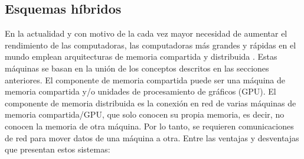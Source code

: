 \vspace{0.35cm}
\begin{table}[htbp]
\centering
\caption{Ventajas y desventajas de las arquitecturas basadas en memoria distribuida.}
\label{tab:distributed_memory}
\end{table}
\vspace{0.35cm}

\subsection{Esquemas híbridos}
\label{sec:esquemas_hibridos}

En la actualidad y con motivo de la cada vez mayor necesidad de aumentar el rendimiento de las computadoras, las computadoras más grandes y rápidas en el mundo emplean arquitecturas de memoria compartida y distribuida \cite{rekimoto1999augmented}. Estas máquinas se basan en la unión de los conceptos descritos en las secciones anteriores. El componente de memoria compartida puede ser una máquina de memoria compartida y/o unidades de procesamiento de gráficos (GPU). El componente de memoria distribuida es la conexión en red de varias máquinas de memoria compartida/GPU, que solo conocen su propia memoria, es decir, no conocen la memoria de otra máquina. Por lo tanto, se requieren comunicaciones de red para mover datos de una máquina a otra. Entre las ventajas y desventajas que presentan estos sistemas: 

